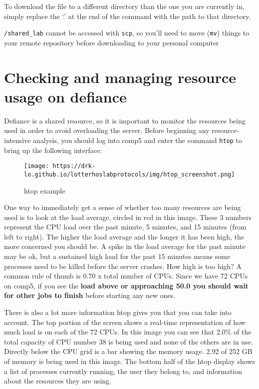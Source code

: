 \documentclass[
  letterpaper,
  DIV=11,
  numbers=noendperiod]{scrreprt}
\begin{document}
To download the file to a different directory than the one you are
currently in, simply replace the `.' at the end of the command with the
path to that directory.

\texttt{/shared\_lab} cannot be accessed with \texttt{scp}, so you'll
need to move (\texttt{mv}) things to your remote repository before
downloading to your personal computer

\hypertarget{checking-and-managing-resource-usage-on-defiance}{%
\section{\texorpdfstring{\textbf{Checking and managing resource usage on
defiance}}{Checking and managing resource usage on defiance}}\label{checking-and-managing-resource-usage-on-defiance}}

Defiance is a shared resource, so it is important to monitor the
resources being used in order to avoid overloading the server. Before
beginning any resource-intensive analysis, you should log into comp5 and
enter the command \texttt{htop} to bring up the following interface:

\begin{figure}

{\centering \texttt{[image: https://drk-lo.github.io/lotterhoslabprotocols/img/htop\_screenshot.png]}

}

\caption{htop example}

\end{figure}

One way to immediately get a sense of whether too many resources are
being used is to look at the load average, circled in red in this image.
These 3 numbers represent the CPU load over the past minute, 5 minutes,
and 15 minutes (from left to right). The higher the load average and the
longer it has been high, the more concerned you should be. A spike in
the load average for the past minute may be ok, but a sustained high
load for the past 15 minutes means some processes need to be killed
before the server crashes. How high is too high? A common rule of thumb
is 0.70 x total number of CPUs. Since we have 72 CPUs on comp5, if you
see the \textbf{load above or approaching 50.0 you should wait for other
jobs to finish} before starting any new ones.

There is also a lot more information htop gives you that you can take
into account. The top portion of the screen shows a real-time
representation of how much load is on each of the 72 CPUs. In this image
you can see that 2.0\% of the total capacity of CPU number 38 is being
used and none of the others are in use. Directly below the CPU grid is a
bar showing the memory usage. 2.92 of 252 GB of memory is being used in
this image. The bottom half of the htop display shows a list of
processes currently running, the user they belong to, and information
about the resources they are using.
\end{document}
